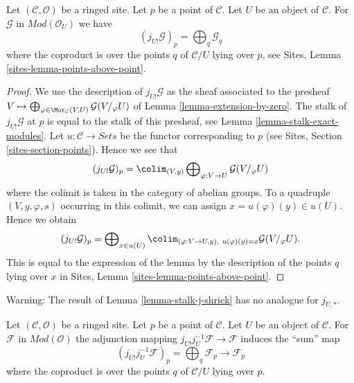 \begin{lemma}
\label{lemma-stalk-j-shriek}
Let $(\mathcal{C}, \mathcal{O})$ be a ringed site.
Let $p$ be a point of $\mathcal{C}$. Let $U$ be an object of $\mathcal{C}$.
For $\mathcal{G}$ in $\textit{Mod}(\mathcal{O}_U)$ we have
$$
(j_{U!}\mathcal{G})_p =
\bigoplus\nolimits_q \mathcal{G}_q
$$
where the coproduct is over the points $q$ of $\mathcal{C}/U$
lying over $p$, see
Sites, Lemma \ref{sites-lemma-points-above-point}.
\end{lemma}

\begin{proof}
We use the description of $j_{U!}\mathcal{G}$ as the sheaf associated
to the presheaf
$V \mapsto
\bigoplus\nolimits_{\varphi \in \Mor_\mathcal{C}(V, U)}
\mathcal{G}(V/_\varphi U)$
of
Lemma \ref{lemma-extension-by-zero}.
The stalk of $j_{U!}\mathcal{G}$ at $p$ is equal to the
stalk of this presheaf, see
Lemma \ref{lemma-stalk-exact-modules}.
Let $u : \mathcal{C} \to \textit{Sets}$ be the functor corresponding
to $p$ (see Sites, Section \ref{sites-section-points}).
Hence we see that
$$
(j_{U!}\mathcal{G})_p = \colim_{(V, y)}
\bigoplus\nolimits_{\varphi : V \to U} \mathcal{G}(V/_\varphi U)
$$
where the colimit is taken in the category of abelian groups.
To a quadruple $(V, y, \varphi, s)$ occurring in this colimit, we can assign
$x = u(\varphi)(y) \in u(U)$. Hence we obtain
$$
(j_{U!}\mathcal{G})_p =
\bigoplus\nolimits_{x \in u(U)}
\colim_{(\varphi : V \to U, y), \ u(\varphi)(y) = x} \mathcal{G}(V/_\varphi U).
$$
This is equal to the expression of the lemma by the description
of the points $q$ lying over $x$ in
Sites, Lemma \ref{sites-lemma-points-above-point}.
\end{proof}

\begin{remark}
\label{remark-not-pushforward}
Warning: The result of
Lemma \ref{lemma-stalk-j-shriek}
has no analogue for $j_{U, *}$.
\end{remark}

\begin{lemma}
\label{lemma-adjunction-on-stalk-j-shriek-j-inverse}
Let $(\mathcal{C}, \mathcal{O})$ be a ringed site.
Let $p$ be a point of $\mathcal{C}$. Let $U$ be an object of $\mathcal{C}$.
For $\mathcal{F}$ in $\textit{Mod}(\mathcal{O})$ the adjunction mapping
$j_{U!}j_U^{-1}\mathcal{F} \to \mathcal{F}$ induces the ``sum'' map
$$
(j_{U!}j_U^{-1}\mathcal{F})_p =
\bigoplus\nolimits_q \mathcal{F}_p
\longrightarrow
\mathcal{F}_p
$$
where the coproduct is over the points $q$ of $\mathcal{C}/U$
lying over $p$.
\end{lemma}

